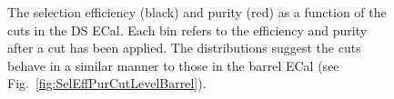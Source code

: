 \begin{figure}
\begin{minipage}{.5\linewidth}
\centering
{}
\end{minipage}\par\medskip
\caption{The selection efficiency (black) and purity (red) as a function of the cuts in the DS ECal.  Each bin refers to the efficiency and purity after a cut has been applied.  The distributions suggest the cuts behave in a similar manner to those in the barrel ECal (see Fig.~\ref{fig:SelEffPurCutLevelBarrel}).}
\label{fig:SelEffPurCutLevelDS}
\end{figure}
